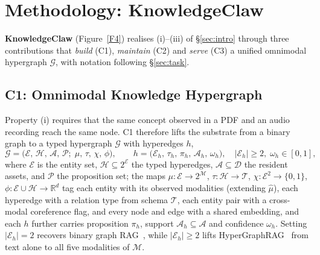 \documentclass{article}
\begin{document}
\section{Methodology: KnowledgeClaw}\label{sec:method}

\textbf{KnowledgeClaw} (Figure~\ref{F4}) realises (i)--(iii) of \S\ref{sec:intro} through three contributions that \emph{build} (C1), \emph{maintain} (C2) and \emph{serve} (C3) a unified omnimodal hypergraph $\mathcal{G}$, with notation following \S\ref{sec:task}.

\subsection{C1: Omnimodal Knowledge Hypergraph}\label{sec:c1}

Property (i) requires that the same concept observed in a PDF and an audio recording reach the same node. C1 therefore lifts the substrate from a binary graph to a typed hypergraph $\mathcal{G}$ with hyperedges $h$,
\begin{equation}
\mathcal{G}\!=\!\bigl(\mathcal{E},\,\mathcal{H},\,\mathcal{A},\,\mathcal{P};\;\mu,\,\tau,\,\chi,\,\phi\bigr),\qquad
h\!=\!\bigl(\mathcal{E}_h,\,\tau_h,\,\pi_h,\,\mathcal{A}_h,\,\omega_h\bigr),\quad |\mathcal{E}_h|\!\geq\!2,\;\omega_h\!\in\![0,1],
\label{eq:hg}
\end{equation}
where $\mathcal{E}$ is the entity set, $\mathcal{H}\!\subseteq\!2^{\mathcal{E}}$ the typed hyperedges, $\mathcal{A}\!\subseteq\!\mathcal{D}$ the resident assets, and $\mathcal{P}$ the proposition set; the maps $\mu\!:\!\mathcal{E}\!\to\!2^{\mathcal{M}}$, $\tau\!:\!\mathcal{H}\!\to\!\mathcal{T}$, $\chi\!:\!\mathcal{E}^{2}\!\to\!\{0,1\}$, $\phi\!:\!\mathcal{E}\!\cup\!\mathcal{H}\!\to\!\mathbb{R}^{d}$ tag each entity with its observed modalities (extending $\hat{\mu}$), each hyperedge with a relation type from schema $\mathcal{T}$, each entity pair with a cross-modal coreference flag, and every node and edge with a shared embedding, and each $h$ further carries proposition $\pi_h$, support $\mathcal{A}_h\!\subseteq\!\mathcal{A}$ and confidence $\omega_h$. Setting $|\mathcal{E}_h|\!=\!2$ recovers binary graph RAG~\citep{GraphRAG,LightRAG}, while $|\mathcal{E}_h|\!\geq\!2$ lifts HyperGraphRAG~\citep{HyperGraphRAG} from text alone to all five modalities of $\mathcal{M}$.
\end{document}
